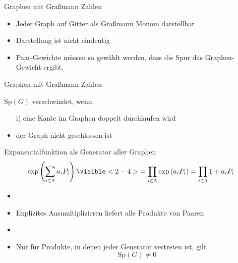 \documentclass[11pt]{beamer}
\newcommand{\Sp}[1]{\mathrm{Sp}\left( #1 \right)}
\renewcommand{\exp}[1]{\mathrm{exp}\left( #1 \right)}
\begin{document}
    \begin{frame}{Graphen mit Graßmann Zahlen}

    \begin{itemize}
    \item Jeder Graph auf Gitter als Graßmann Monom darstellbar
    \item[]
    \pause
    \item Darstellung ist nicht eindeutig
    \item[]
    \pause
    \item Paar-Gewichte müssen so gewählt werden, dass die Spur das Graphen-Gewicht ergibt.  
    \end{itemize}
    \end{frame}
    
    \begin{frame}{Graphen mit Graßmann Zahlen}
    
    $\Sp{G}$ verschwindet, wenn: 
    \begin{itemize}
        \item[]
        \item[i)] eine Kante im Graphen doppelt durchlaufen wird
        \item[]
        \item<2-3>[ii)] der Graph nicht geschlossen ist
    \end{itemize}
    
    \vspace{0.8cm}
    
    \end{frame}

    \begin{frame}{Exponentialfunktion als Generator aller Graphen}
    \begin{align} \nonumber
    \exp{\sum_{i\in\Lambda} a_i P_i} \visible<2-4>{= \prod_{i\in\Lambda} \exp{a_i P_i} = \prod_{i\in\Lambda} 1 + a_i P_i }
    \end{align}
    \centering
    \begin{itemize}
    \item<3-4>[]
    \item<3-4> Explizites Ausmultiplizieren liefert alle Produkte von Paaren
    \item<4>[]
    \item<4> Nur für Produkte, in denen jeder Generator vertreten ist, gilt $$\Sp{G} \neq 0$$
    \end{itemize}
    \end{frame}
    
\end{document}
